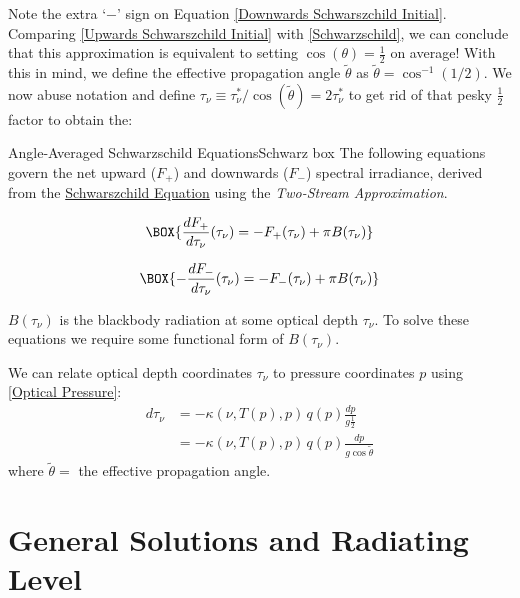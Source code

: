 Note the extra `$-$' sign on Equation \ref{Downwards Schwarszchild Initial}. Comparing \ref{Upwards Schwarszchild Initial} with \ref{Schwarzschild}, we can conclude that this approximation is equivalent to setting $\cos(\theta)=\frac{1}{2}$ on average! With this in mind, we define the effective propagation angle $\tilde{\theta}$ as $\tilde{\theta}=\cos^{-1}(1/2)$. We now abuse notation and define $\tau_\nu\equiv \tau_\nu^*/\cos(\tilde{\theta})=2\tau_\nu^*$ to get rid of that pesky $\frac{1}{2}$ factor to obtain the: 
\begin{fact}{Angle-Averaged Schwarzschild Equations}{Schwarz box}\label{Scharz box}
    The following equations govern the net upward ($F_+$) and downwards ($F_-$) spectral irradiance, derived from the \hyperref[Schwarzschild]{Schwarszchild Equation} using the \textit{Two-Stream Approximation}.

    \begin{minipage}{.5\linewidth}
        \begin{gather}
        \label{Upwards Schwarzschild}
        \BOX{\frac{dF_+}{d\tau_\nu}(\tau_\nu)=-F_+(\tau_\nu)+\pi B(\tau_\nu)}
        \end{gather}
    \end{minipage}
    \begin{minipage}{.5\linewidth}
        \begin{gather}
        \label{Downwards Schwarzschild}
        \BOX{-\frac{dF_-}{d\tau_\nu}(\tau_\nu)=-F_-(\tau_\nu)+\pi B(\tau_\nu)}
        \end{gather}
    \end{minipage}

    $B(\tau_\nu)$ is the blackbody radiation at some optical depth $\tau_\nu$. To solve these equations we require some functional form of $B(\tau_\nu)$.

    We can relate optical depth coordinates $\tau_\nu$ to pressure coordinates $p$ using \ref{Optical Pressure}:
    \begin{align}
        d\tau_\nu&=-\kappa(\nu,T(p),p)\,q(p)\frac{dp}{g\frac{1}{2}}\\
        &=-\kappa(\nu,T(p),p)\,q(p)\frac{dp}{g\cos\tilde{\theta}}
    \end{align}
    where $\tilde{\theta}=$ the effective propagation angle.
\end{fact}


\section{General Solutions and Radiating Level}

